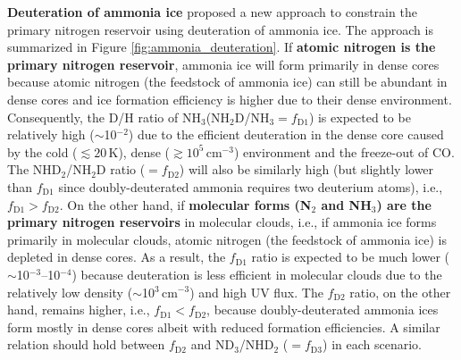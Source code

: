 \documentclass[12pt,a4paper]{article}  %
\newcommand{\ammonia}{NH$_3$\xspace}
\begin{document}



\medskip
\noindent \textbf{Deuteration of ammonia ice} \quad  %
\citet{Furuya18} proposed a new approach to constrain the primary nitrogen reservoir using deuteration of ammonia ice. The approach is summarized in Figure \ref{fig:ammonia_deuteration}. If \textbf{atomic nitrogen is the primary nitrogen reservoir}, ammonia ice will form primarily in dense cores because atomic nitrogen (the feedstock of ammonia ice) can still be abundant in dense cores and ice formation efficiency is higher due to their dense environment. Consequently, the D/H ratio of \ammonia (NH$_2$D/NH$_3=f_\mathrm{D1}$) is expected to be relatively high ($\sim$10$^{-2}$) due to the efficient deuteration in the dense core caused by the cold ($\lesssim20$\,K), dense ($\gtrsim10^5$\,cm$^{-3}$) environment and the freeze-out of CO. The NHD$_2$/NH$_2$D ratio ($=f_\mathrm{D2}$) will also be similarly high (but slightly lower than $f_\mathrm{D1}$ since doubly-deuterated ammonia requires two deuterium atoms), i.e., $f_\mathrm{D1} > f_\mathrm{D2}$. On the other hand, if \textbf{molecular forms (N$_2$ and NH$_3$) are the primary nitrogen reservoirs} in molecular clouds, i.e., if ammonia ice forms primarily in molecular clouds, atomic nitrogen (the feedstock of ammonia ice) is depleted in dense cores. As a result, the $f_\mathrm{D1}$ ratio is expected to be much lower ($\sim$10$^{-3}$--10$^{-4}$) because deuteration is less efficient in molecular clouds due to the relatively low density ($\sim$10$^{3}$\,cm$^{-3}$) and high UV flux. The $f_\mathrm{D2}$ ratio, on the other hand, remains higher, i.e., $f_\mathrm{D1}<f_\mathrm{D2}$, because doubly-deuterated ammonia ices form mostly in dense cores albeit with reduced formation efficiencies. A similar relation should hold between $f_\mathrm{D2}$ and ND$_3$/NHD$_2$ ($=f_\mathrm{D3}$) in each scenario.
\end{document}
